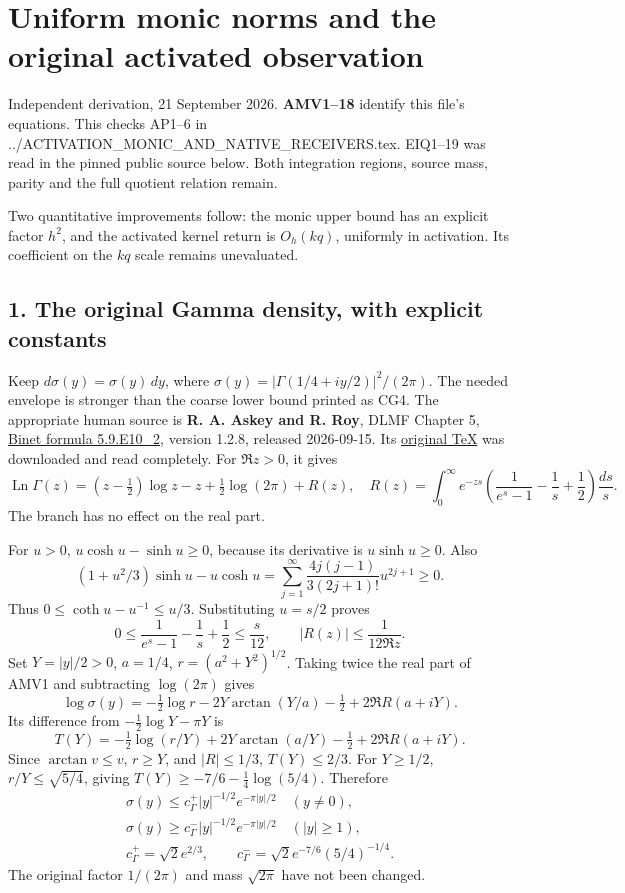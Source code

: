 \documentclass[11pt]{article}
\begin{document}
\section{Uniform monic norms and the original activated observation}\label{uniform-monic-norms-and-the-original-activated-observation}

Independent derivation, 21 September 2026. \textbf{AMV1--18} identify this file's equations. This checks AP1--6 in ../ACTIVATION\_MONIC\_AND\_NATIVE\_RECEIVERS.tex. EIQ1--19 was read in the pinned public source below. Both integration regions, source mass, parity and the full quotient relation remain.

Two quantitative improvements follow: the monic upper bound has an explicit factor \(h^2\), and the activated kernel return is \(O_h(kq)\), uniformly in activation. Its coefficient on the \(kq\) scale remains unevaluated.

\subsection{1. The original Gamma density, with explicit constants}\label{the-original-gamma-density-with-explicit-constants}

Keep \(d\sigma(y)=\sigma(y)\,dy\), where \(\sigma(y)=|\Gamma(1/4+iy/2)|^2/(2\pi)\). The needed envelope is stronger than the coarse lower bound printed as CG4. The appropriate human source is \textbf{R. A. Askey and R. Roy}, DLMF Chapter 5, \href{https://dlmf.nist.gov/5.9.E10_2}{Binet formula 5.9.E10\_2}, version 1.2.8, released 2026-09-15. Its \href{https://dlmf.nist.gov/5.9.E10_2.tex}{original TeX} was downloaded and read completely. For \(\Re z>0\), it gives \[
\operatorname{Ln}\Gamma(z)=(z-\tfrac12)\log z-z+\tfrac12\log(2\pi)+R(z),\quad
R(z)=\int_0^\infty e^{-zs}
\left(\frac1{e^s-1}-\frac1s+\frac12\right)\frac{ds}{s}.
\tag{AMV1}
\] The branch has no effect on the real part.

For \(u>0\), \(u\cosh u-\sinh u\ge0\), because its derivative is \(u\sinh u\ge0\). Also \[
(1+u^2/3)\sinh u-u\cosh u
=\sum_{j=1}^\infty\frac{4j(j-1)}{3(2j+1)!}u^{2j+1}\ge0.
\] Thus \(0\le\coth u-u^{-1}\le u/3\). Substituting \(u=s/2\) proves \[
0\le\frac1{e^s-1}-\frac1s+\frac12\le\frac{s}{12},
\qquad |R(z)|\le\frac1{12\Re z}.
\tag{AMV2}
\] Set \(Y=|y|/2>0\), \(a=1/4\), \(r=(a^2+Y^2)^{1/2}\). Taking twice the real part of AMV1 and subtracting \(\log(2\pi)\) gives \[
\log\sigma(y)=-\tfrac12\log r-2Y\arctan(Y/a)-\tfrac12+2\Re R(a+iY).
\] Its difference from \(-\tfrac12\log Y-\pi Y\) is \[
T(Y)=-\tfrac12\log(r/Y)+2Y\arctan(a/Y)-\tfrac12+2\Re R(a+iY).
\] Since \(\arctan v\le v\), \(r\ge Y\), and \(|R|\le1/3\), \(T(Y)\le2/3\). For \(Y\ge1/2\), \(r/Y\le\sqrt{5/4}\), giving \(T(Y)\ge-7/6-\tfrac14\log(5/4)\). Therefore \[
\begin{gathered}
\sigma(y)\le c_\Gamma^+|y|^{-1/2}e^{-\pi|y|/2}\quad(y\ne0),\\
\sigma(y)\ge c_\Gamma^-|y|^{-1/2}e^{-\pi|y|/2}\quad(|y|\ge1),\\
c_\Gamma^+=\sqrt2e^{2/3},\qquad
c_\Gamma^-=\sqrt2e^{-7/6}(5/4)^{-1/4}.
\end{gathered}\tag{AMV3}
\] The original factor \(1/(2\pi)\) and mass \(\sqrt{2\pi}\) have not been changed.
\end{document}
